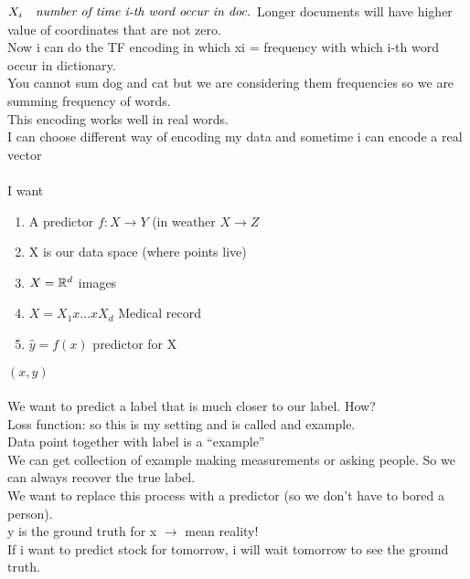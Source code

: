 $X_i\quad \textit{number of time i-th word occur in doc.}\\ $
Longer documents will have higher value of coordinates that are not zero.\\
Now i can do the TF encoding in which xi = frequency with which i-th word
occur in dictionary.\\
You cannot sum dog and cat but we are considering them frequencies so we
are summing frequency of words.\\
This encoding works well in real words.\\
I can choose different way of encoding my data and sometime i can encode a
real vector\\\\
I want
\begin{enumerate}
\item A predictor $f: X \longrightarrow Y$ (in weather $X \longrightarrow Z $
\item X is our data space (where points live)
\item $X = \mathbb{R}^d$ images
\item $ X = X_1 x ... x X_d$ Medical record
\item $\hat{y} = f(x) $ predictor for X
\end{enumerate}
$(x,y)$\\\\
We want to predict a label that is much closer to our label. How?\\
Loss function: so this is my setting and is called and example.\\
Data point together with label is a “example”\\
We can get collection of example making measurements or asking people. So
we can always recover the true label.\\
We want to replace this process with a predictor (so we don’t have to bored a
person).\\
y is the ground truth for x $\rightarrow$ mean reality!\\
If i want to predict stock for tomorrow, i will wait tomorrow to see the ground truth.

